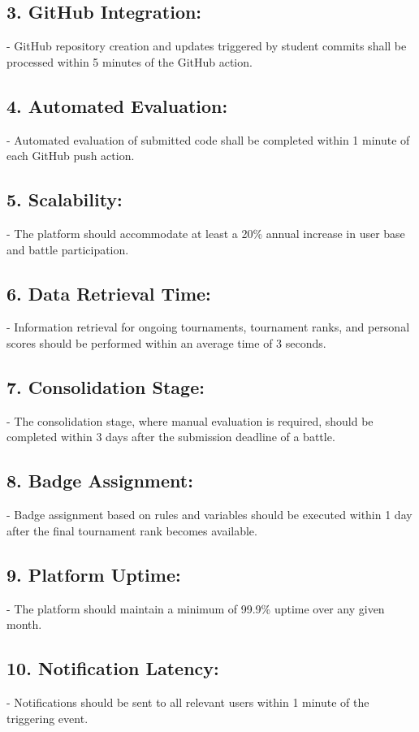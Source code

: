 \subsection*{3. GitHub Integration:}
   - GitHub repository creation and updates triggered by student commits shall be processed within 5 minutes of the GitHub action.

\subsection*{4. Automated Evaluation:}
   - Automated evaluation of submitted code shall be completed within 1 minute of each GitHub push action.

\subsection*{5. Scalability:}
   - The platform should accommodate at least a 20\% annual increase in user base and battle participation.

\subsection*{6. Data Retrieval Time:}
   - Information retrieval for ongoing tournaments, tournament ranks, and personal scores should be performed within an average time of 3 seconds.

\subsection*{7. Consolidation Stage:}
   - The consolidation stage, where manual evaluation is required, should be completed within 3 days after the submission deadline of a battle.

\subsection*{8. Badge Assignment:}
   - Badge assignment based on rules and variables should be executed within 1 day after the final tournament rank becomes available.

\subsection*{9. Platform Uptime:}
   - The platform should maintain a minimum of 99.9\% uptime over any given month.

\subsection*{10. Notification Latency:}
    - Notifications should be sent to all relevant users within 1 minute of the triggering event.

